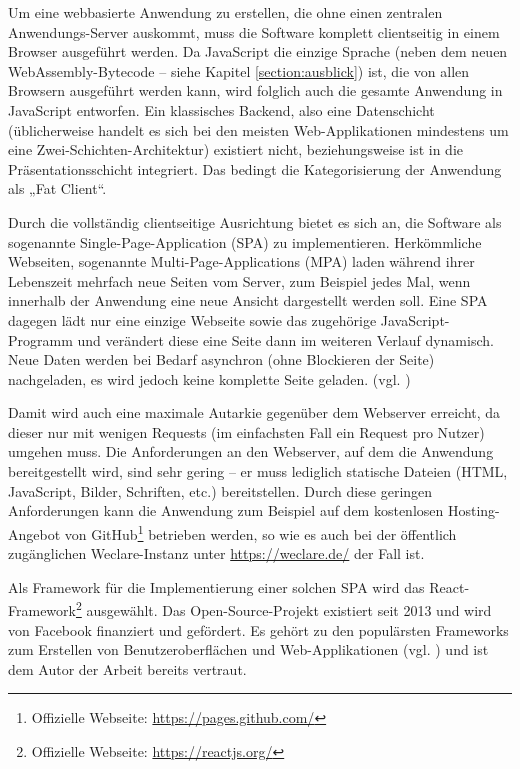 Um eine webbasierte Anwendung zu erstellen, die ohne einen zentralen Anwendungs-Server auskommt, muss die Software komplett clientseitig in einem Browser ausgeführt werden. Da JavaScript die einzige Sprache (neben dem neuen WebAssembly-Bytecode – siehe Kapitel \ref{section:ausblick}) ist, die von allen Browsern ausgeführt werden kann, wird folglich auch die gesamte Anwendung in JavaScript entworfen. Ein klassisches Backend, also eine Datenschicht (üblicherweise handelt es sich bei den meisten Web-Applikationen mindestens um eine Zwei-Schichten-Architektur) existiert nicht, beziehungsweise ist in die Präsentationsschicht integriert. Das bedingt die Kategorisierung der Anwendung als „Fat Client“.

Durch die vollständig clientseitige Ausrichtung bietet es sich an, die Software als sogenannte Single-Page-Application (SPA) zu implementieren. Herkömmliche Webseiten, sogenannte Multi-Page-Applications (MPA) laden während ihrer Lebenszeit mehrfach neue Seiten vom Server, zum Beispiel jedes Mal, wenn innerhalb der Anwendung eine neue Ansicht dargestellt werden soll. Eine SPA dagegen lädt nur eine einzige Webseite sowie das zugehörige JavaScript-Programm und verändert diese eine Seite dann im weiteren Verlauf dynamisch. Neue Daten werden bei Bedarf asynchron (ohne Blockieren der Seite) nachgeladen, es wird jedoch keine komplette Seite geladen. (vgl. \cite[S. 1]{art:single_page_multi_page})

Damit wird auch eine maximale Autarkie gegenüber dem Webserver erreicht, da dieser nur mit wenigen Requests (im einfachsten Fall ein Request pro Nutzer) umgehen muss. Die Anforderungen an den Webserver, auf dem die Anwendung bereitgestellt wird, sind sehr gering – er muss lediglich statische Dateien (HTML, JavaScript, Bilder, Schriften, etc.) bereitstellen. Durch diese geringen Anforderungen kann die Anwendung zum Beispiel auf dem kostenlosen Hosting-Angebot von GitHub\footnote{Offizielle Webseite: \url{https://pages.github.com/}} betrieben werden, so wie es auch bei der öffentlich zugänglichen Weclare-Instanz unter \url{https://weclare.de/} der Fall ist.

Als Framework für die Implementierung einer solchen SPA wird das React-Framework\footnote{Offizielle Webseite: \url{https://reactjs.org/}} ausgewählt. Das Open-Source-Projekt existiert seit 2013 und wird von Facebook finanziert und gefördert. Es gehört zu den populärsten Frameworks zum Erstellen von Benutzeroberflächen und Web-Applikationen (vgl. \cite{web:stackoverflow_umfrage}) und ist dem Autor der Arbeit bereits vertraut.

